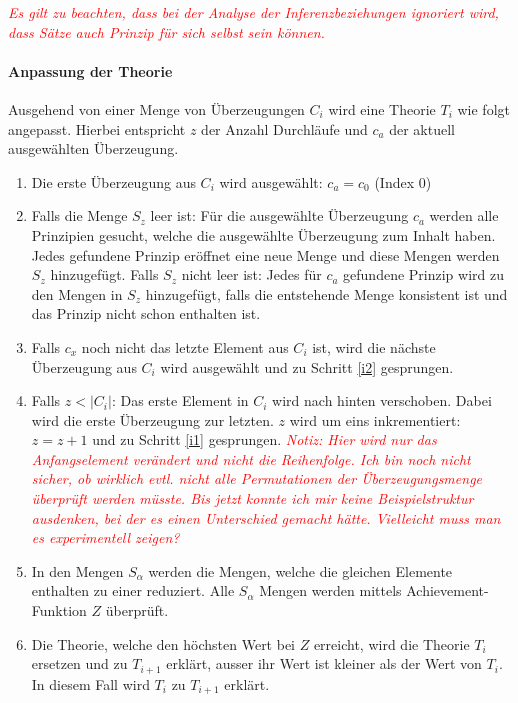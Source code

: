 \documentclass{article}
\begin{document}
\textcolor{red}{\textit{Es gilt zu beachten, dass bei der Analyse der Inferenzbeziehungen ignoriert wird, dass Sätze auch Prinzip für sich selbst sein können.}}

\paragraph{Anpassung der Theorie}
Ausgehend von einer Menge von Überzeugungen $C_i$ wird eine Theorie $T_i$ wie folgt angepasst. Hierbei entspricht $z$ der Anzahl Durchläufe und $c_a$ der aktuell ausgewählten Überzeugung. 
\begin{enumerate}
    \item \label{i1} Die erste Überzeugung aus $C_i$ wird ausgewählt: $c_a = c_0$ (Index 0)
    \item \label{i2} Falls die Menge $S_z$ leer ist: Für die ausgewählte Überzeugung $c_a$ werden alle Prinzipien gesucht, welche die ausgewählte Überzeugung zum Inhalt haben. Jedes gefundene Prinzip eröffnet eine neue Menge und diese Mengen werden $S_z$ hinzugefügt. Falls $S_z$ nicht leer ist: Jedes für $c_a$ gefundene Prinzip wird zu den Mengen in $S_z$ hinzugefügt, falls die entstehende Menge konsistent ist und das Prinzip nicht schon enthalten ist.
    \item \label{i3} Falls $c_x$ noch nicht das letzte Element aus $C_i$ ist, wird die nächste Überzeugung aus $C_i$ wird ausgewählt und zu Schritt \ref{i2} gesprungen.
    \item \label{i4} Falls $z < \lvert C_i \rvert$: Das erste Element in $C_i$ wird nach hinten verschoben. Dabei wird die erste Überzeugung zur letzten. $z$ wird um eins inkrementiert: $z = z + 1$ und zu Schritt \ref{i1} gesprungen. %
    \textcolor{red}{\textit{Notiz: Hier wird nur das Anfangselement verändert und nicht die Reihenfolge. Ich bin noch nicht sicher, ob wirklich evtl. nicht alle Permutationen der Überzeugungsmenge überprüft werden müsste. Bis jetzt konnte ich mir keine Beispielstruktur ausdenken, bei der es einen Unterschied gemacht hätte. Vielleicht muss man es experimentell zeigen?}}
    \item \label{i5} In den Mengen $S_\alpha$ werden die Mengen, welche die gleichen Elemente enthalten zu einer reduziert. Alle $S_\alpha$ Mengen werden mittels Achievement-Funktion $Z$ überprüft.
    \item \label{i6} Die Theorie, welche den höchsten Wert bei $Z$ erreicht, wird die Theorie $T_i$ ersetzen und zu $T_{i+1}$ erklärt, ausser ihr Wert ist kleiner als der Wert von $T_i$. In diesem Fall wird $T_i$ zu $T_{i+1}$ erklärt.
\end{enumerate}
\end{document}
